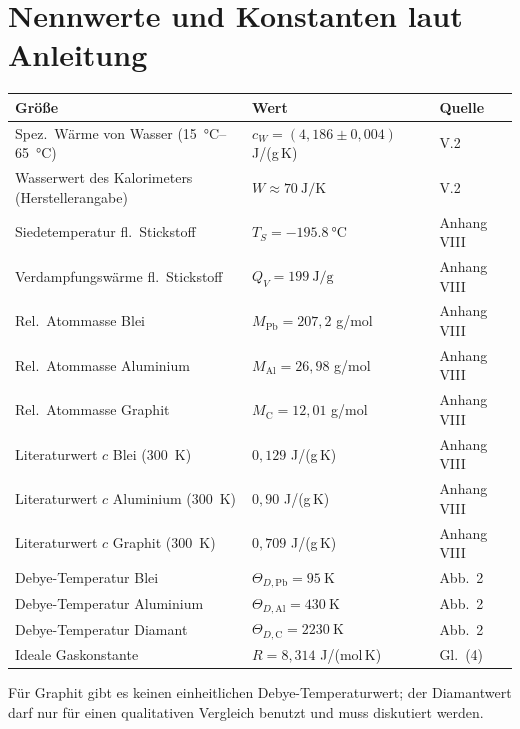 \documentclass{article}
\newcommand{\zhs}{\rule[-2mm]{0pt}{7mm}}
\newenvironment{tblock}{\par\noindent\begin{minipage}{\linewidth}}{\end{minipage}\par}
\newcommand{\abschnitt}[1]{\Needspace{9cm}\section{#1}}
\begin{document}
\abschnitt{Nennwerte und Konstanten laut Anleitung}

\begin{tblock}
  {\small
  \begin{tabular}{|L{6.0cm}|L{5.4cm}|L{2.6cm}|}
    \hline
    \zhs\textbf{Gr\"o\ss{}e} & \textbf{Wert} & \textbf{Quelle} \\
    \hline\hline
    \zhs Spez.\ W\"arme von Wasser (\SIrange{15}{65}{\celsius})
      & $c_W = (4{,}186 \pm 0{,}004)$ J/(g\,K) & V.2 \\ \hline
    \zhs Wasserwert des Kalorimeters (Herstellerangabe)
      & $W \approx \SI{70}{\joule\per\kelvin}$ & V.2 \\ \hline
    \zhs Siedetemperatur fl.\ Stickstoff & $T_S = \SI{-195.8}{\celsius}$ & Anhang VIII \\ \hline
    \zhs Verdampfungsw\"arme fl.\ Stickstoff & $Q_V = \SI{199}{\joule\per\gram}$ & Anhang VIII \\ \hline
    \zhs Rel.\ Atommasse Blei & $M_\mathrm{Pb} = 207{,}2$ g/mol & Anhang VIII \\ \hline
    \zhs Rel.\ Atommasse Aluminium & $M_\mathrm{Al} = 26{,}98$ g/mol & Anhang VIII \\ \hline
    \zhs Rel.\ Atommasse Graphit & $M_\mathrm{C} = 12{,}01$ g/mol & Anhang VIII \\ \hline
    \zhs Literaturwert $c$ Blei (\SI{300}{\kelvin}) & $0{,}129$ J/(g\,K) & Anhang VIII \\ \hline
    \zhs Literaturwert $c$ Aluminium (\SI{300}{\kelvin}) & $0{,}90$ J/(g\,K) & Anhang VIII \\ \hline
    \zhs Literaturwert $c$ Graphit (\SI{300}{\kelvin}) & $0{,}709$ J/(g\,K) & Anhang VIII \\ \hline
    \zhs Debye-Temperatur Blei & $\Theta_{D,\mathrm{Pb}} = \SI{95}{\kelvin}$ & Abb.~2 \\ \hline
    \zhs Debye-Temperatur Aluminium & $\Theta_{D,\mathrm{Al}} = \SI{430}{\kelvin}$ & Abb.~2 \\ \hline
    \zhs Debye-Temperatur Diamant & $\Theta_{D,\mathrm{C}} = \SI{2230}{\kelvin}$ & Abb.~2 \\ \hline
    \zhs Ideale Gaskonstante & $R = 8{,}314$ J/(mol\,K) & Gl.~(4) \\ \hline
  \end{tabular}}

  \vspace{1mm}
  {\footnotesize F\"ur Graphit gibt es keinen einheitlichen Debye-Temperaturwert; der
  Diamantwert darf nur f\"ur einen qualitativen Vergleich benutzt und muss diskutiert werden.}
\end{tblock}
\end{document}

